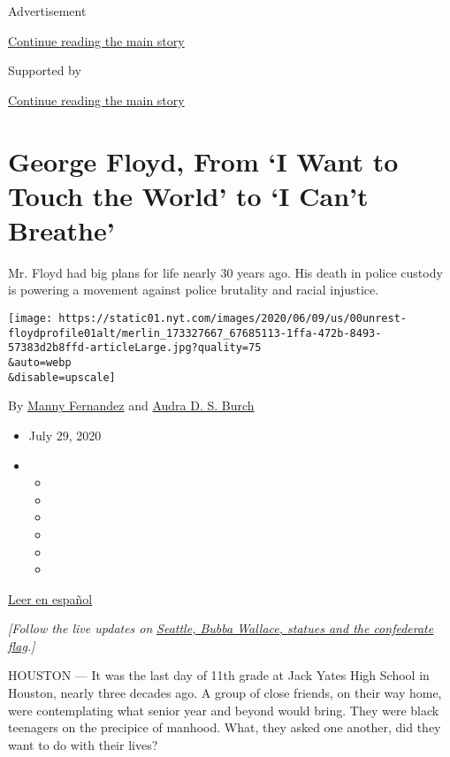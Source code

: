 Advertisement

\protect\hyperlink{after-top}{Continue reading the main story}

Supported by

\protect\hyperlink{after-sponsor}{Continue reading the main story}

\hypertarget{george-floyd-from-i-want-to-touch-the-world-to-i-cant-breathe}{%
\section{George Floyd, From `I Want to Touch the World' to `I Can't
Breathe'}\label{george-floyd-from-i-want-to-touch-the-world-to-i-cant-breathe}}

Mr. Floyd had big plans for life nearly 30 years ago. His death in
police custody is powering a movement against police brutality and
racial injustice.

\texttt{[image: https://static01.nyt.com/images/2020/06/09/us/00unrest-floydprofile01alt/merlin\_173327667\_67685113-1ffa-472b-8493-57383d2b8ffd-articleLarge.jpg?quality=75\\\&auto=webp\\\&disable=upscale]}

By \href{https://www.nytimes.com/by/manny-fernandez}{Manny Fernandez}
and \href{https://www.nytimes.com/by/audra-d-s-burch}{Audra D. S. Burch}

\begin{itemize}
\item
  July 29, 2020
\item
  \begin{itemize}
  \item
  \item
  \item
  \item
  \item
  \item
  \end{itemize}
\end{itemize}

\href{https://www.nytimes.com/es/2020/06/09/espanol/mundo/George-Floyd-quien-es.html}{Leer
en español}

\emph{{[}Follow the live updates on}
\href{https://www.nytimes.com/2020/06/22/us/seattle-shooting-roosevelt-statue-nascar-noose.html}{\emph{Seattle,
Bubba Wallace, statues and the confederate flag}}\emph{.{]}}

HOUSTON --- It was the last day of 11th grade at Jack Yates High School
in Houston, nearly three decades ago. A group of close friends, on their
way home, were contemplating what senior year and beyond would bring.
They were black teenagers on the precipice of manhood. What, they asked
one another, did they want to do with their lives?

